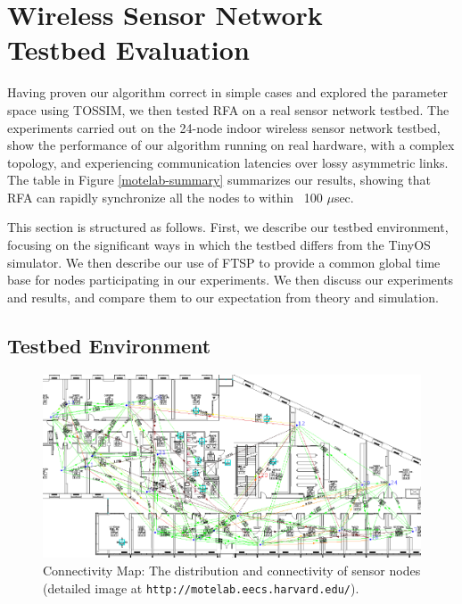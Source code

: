 \documentclass{sig-alternate}
\begin{document}
{\section{Wireless Sensor Network\\ Testbed Evaluation}
\label{sec-motes}

Having proven our algorithm correct in simple cases and explored the
parameter space using TOSSIM, we then tested RFA on a real sensor
network testbed. The experiments carried out on the 24-node indoor
wireless sensor network testbed, show the performance of our algorithm
running on real hardware, with a complex topology, and experiencing
communication latencies over lossy asymmetric links. The table in
Figure \ref{motelab-summary} summarizes our results, showing that RFA
can rapidly synchronize all the nodes to within ~100 $\mu$sec.

This section is structured as follows.  First, we describe our testbed
environment, focusing on the significant ways in which the testbed
differs from the TinyOS simulator.  We then describe our use of FTSP
to provide a common global time base for nodes participating in our
experiments. We then discuss our experiments and results, and compare
them to our expectation from theory and simulation.


\subsection{Testbed Environment}

\begin{figure}
\begin{center}
\includegraphics[width=0.9\hsize]{./figures/motelab-map.png}
\end{center}
\caption{Connectivity Map: The distribution and connectivity of sensor
nodes (detailed image at {\tt http://motelab.eecs.harvard.edu/}).}
\label{connectivity-map}
\end{figure}

}
\end{document}
